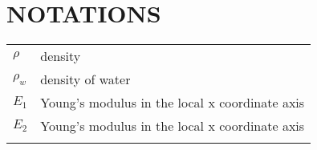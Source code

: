 \chapter*{\centering NOTATIONS}

\begin{tabular}{p{3cm}  p{10cm}}
    $\rho$   &    density \\
    $ \rho_w $ & density of water\\
    
   $ E_1 $  & Young's modulus in the local x coordinate axis \\
   $ E_2 $ & Young's modulus in the local x coordinate axis \\
   $  $
\end{tabular}